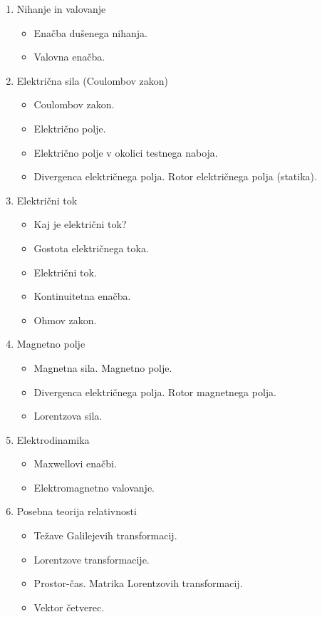 \begin{enumerate}
    \item Nihanje in valovanje
    \begin{itemize}
        \item Enačba dušenega nihanja.
        \item Valovna enačba.
    \end{itemize}

    \item Električna sila (Coulombov zakon)
    \begin{itemize}
        \item Coulombov zakon.
        \item Električno polje.
        \item Električno polje v okolici testnega naboja.
        \item Divergenca električnega polja. Rotor električnega polja (statika). 
    \end{itemize}

    \item Električni tok
    \begin{itemize}
        \item Kaj je električni tok?
        \item Gostota električnega toka.
        \item Električni tok.
        \item Kontinuitetna enačba.
        \item Ohmov zakon.
    \end{itemize}

    \item Magnetno polje
    \begin{itemize}
        \item Magnetna sila. Magnetno polje.
        \item Divergenca električnega polja. Rotor magnetnega polja.
        \item Lorentzova sila.
    \end{itemize}

    \item Elektrodinamika
    \begin{itemize}
        \item Maxwellovi enačbi.
        \item Elektromagnetno valovanje.
    \end{itemize}

    \item Posebna teorija relativnosti
    \begin{itemize}
        \item Težave Galilejevih transformacij.
        \item Lorentzove transformacije.
        \item Prostor-čas. Matrika Lorentzovih transformacij.
        \item Vektor četverec.
    \end{itemize}
\end{enumerate}